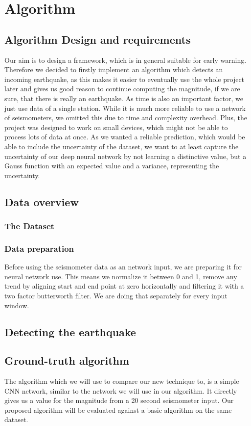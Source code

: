 \documentclass[thesis.tex]{subfiles}
\begin{document}
\chapter{Algorithm}\label{chap:basics}

\section{Algorithm Design and requirements}
Our aim is to design a framework, which is in general suitable for early warning. Therefore we decided to firstly implement an algorithm which detects an incoming earthquake, as this makes it easier to eventually use the whole project later and gives us good reason to continue computing the magnitude, if we are sure, that there is really an earthquake. As time is also an important factor, we just use data of a single station. While it is much more reliable to use a network of seismometers, we omitted this due to time and complexity overhead. Plus, the project was designed to work on small devices, which might not be able to process lots of data at once. As we wanted a reliable prediction, which would be able to include the uncertainty of the dataset, we want to at least capture the uncertainty of our deep neural network by not learning a distinctive value, but a Gauss function with an expected value and a variance, representing the uncertainty.
\section{Data overview}
\subsection{The Dataset}
\subsection{Data preparation}
Before using the seismometer data as an network input, we are preparing it for neural network use. This means we normalize it between 0 and 1, remove any trend by aligning start and end point at zero horizontally and filtering it with a two factor butterworth filter. We are doing that separately for every input window. 
\section{Detecting the earthquake}

\section{Ground-truth algorithm}
The algorithm which we will use to compare our new technique to, is a simple CNN network, similar to the network we will use in our algorithm. It directly gives us a value for the magnitude from a 20 second seismometer input.
Our proposed algorithm will be evaluated against a basic algorithm on the same dataset. 
\end{document}
